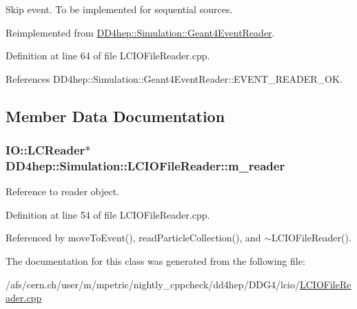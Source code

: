 Skip event. To be implemented for sequential sources. 

Reimplemented from \hyperlink{class_d_d4hep_1_1_simulation_1_1_geant4_event_reader_a9381626ad4f4fa20e304414f6654ee03}{DD4hep::Simulation::Geant4EventReader}.

Definition at line 64 of file LCIOFileReader.cpp.

References DD4hep::Simulation::Geant4EventReader::EVENT\_\-READER\_\-OK.

\subsection{Member Data Documentation}
\hypertarget{class_d_d4hep_1_1_simulation_1_1_l_c_i_o_file_reader_a11b157abd2a7ac565d63d82158974ad7}{
\subsubsection[{m\_\-reader}]{\setlength{\rightskip}{0pt plus 5cm}IO::LCReader$\ast$ {\bf DD4hep::Simulation::LCIOFileReader::m\_\-reader}}}
\label{class_d_d4hep_1_1_simulation_1_1_l_c_i_o_file_reader_a11b157abd2a7ac565d63d82158974ad7}


Reference to reader object. 

Definition at line 54 of file LCIOFileReader.cpp.

Referenced by moveToEvent(), readParticleCollection(), and $\sim$LCIOFileReader().

The documentation for this class was generated from the following file:\begin{DoxyCompactItemize}
\item 
/afs/cern.ch/user/m/mpetric/nightly\_\-cppcheck/dd4hep/DDG4/lcio/\hyperlink{_l_c_i_o_file_reader_8cpp}{LCIOFileReader.cpp}\end{DoxyCompactItemize}
